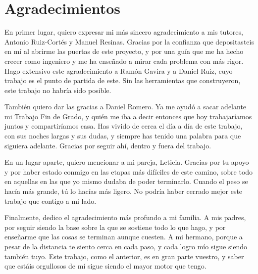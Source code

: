 \chapter*{Agradecimientos}
En primer lugar, quiero expresar mi más sincero agradecimiento a mis tutores,
Antonio Ruiz-Cortés y Manuel Resinas. Gracias por la confianza que depositasteis
en mí al abrirme las puertas de este proyecto, y por una guía que me ha hecho
crecer como ingeniero y me ha enseñado a mirar cada problema con más rigor.
Hago extensivo este agradecimiento a Ramón Gavira y a Daniel Ruiz, cuyo trabajo
es el punto de partida de este. Sin las herramientas que construyeron, este
trabajo no habría sido posible.

También quiero dar las gracias a Daniel Romero. Ya me ayudó a sacar adelante mi
Trabajo Fin de Grado, y quién me iba a decir entonces que hoy trabajaríamos
juntos y compartiríamos casa. Has vivido de cerca el día a día de este trabajo,
con sus noches largas y sus dudas, y siempre has tenido una palabra para que
siguiera adelante. Gracias por seguir ahí, dentro y fuera del trabajo.

En un lugar aparte, quiero mencionar a mi pareja, Leticia. Gracias por tu apoyo
y por haber estado conmigo en las etapas más difíciles de este camino, sobre
todo en aquellas en las que yo mismo dudaba de poder terminarlo. Cuando el peso
se hacía más grande, tú lo hacías más ligero. No podría haber cerrado mejor este
trabajo que contigo a mi lado.

Finalmente, dedico el agradecimiento más profundo a mi familia. A mis padres,
por seguir siendo la base sobre la que se sostiene todo lo que hago, y por
enseñarme que las cosas se terminan aunque cuesten. A mi hermano, porque a
pesar de la distancia te siento cerca en cada paso, y cada logro mío sigue
siendo también tuyo. Este trabajo, como el anterior, es en gran parte vuestro,
y saber que estáis orgullosos de mí sigue siendo el mayor motor que tengo.
